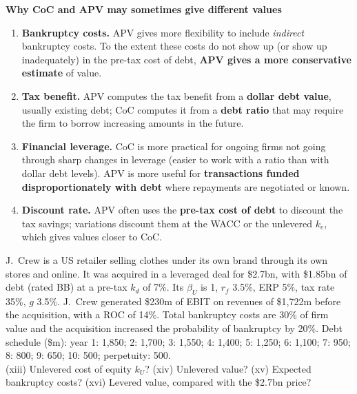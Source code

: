 \textbf{Why CoC and APV may sometimes give different values}
\begin{enumerate}
  \item \textbf{Bankruptcy costs.} APV gives more flexibility to include \emph{indirect} bankruptcy costs. To the extent these costs do not show up (or show up inadequately) in the pre-tax cost of debt, \textbf{APV gives a more conservative estimate} of value.
  \item \textbf{Tax benefit.} APV computes the tax benefit from a \textbf{dollar debt value}, usually existing debt; CoC computes it from a \textbf{debt ratio} that may require the firm to borrow increasing amounts in the future.
  \item \textbf{Financial leverage.} CoC is more practical for ongoing firms not going through sharp changes in leverage (easier to work with a ratio than with dollar debt levels). APV is more useful for \textbf{transactions funded disproportionately with debt} where repayments are negotiated or known.
  \item \textbf{Discount rate.} APV often uses the \textbf{pre-tax cost of debt} to discount the tax savings; variations discount them at the WACC or the unlevered $k_e$, which gives values closer to CoC.
\end{enumerate}

\begin{exbox}
J.\ Crew is a US retailer selling clothes under its own brand through its own stores and online. It was acquired in a leveraged deal for \$2.7bn, with \$1.85bn of debt (rated BB) at a pre-tax $k_d$ of 7\%. Its $\beta_U$ is 1, $r_f$ 3.5\%, ERP 5\%, tax rate 35\%, $g$ 3.5\%. J.\ Crew generated \$230m of EBIT on revenues of \$1,722m before the acquisition, with a ROC of 14\%. Total bankruptcy costs are 30\% of firm value and the acquisition increased the probability of bankruptcy by 20\%. Debt schedule (\$m): year 1: 1,850; 2: 1,700; 3: 1,550; 4: 1,400; 5: 1,250; 6: 1,100; 7: 950; 8: 800; 9: 650; 10: 500; perpetuity: 500.\\
(xiii) Unlevered cost of equity $k_U$? (xiv) Unlevered value? (xv) Expected bankruptcy costs? (xvi) Levered value, compared with the \$2.7bn price?
\end{exbox}

